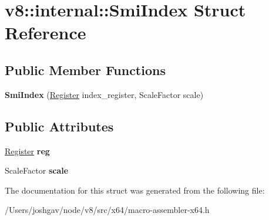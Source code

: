 \hypertarget{structv8_1_1internal_1_1_smi_index}{}\section{v8\+:\+:internal\+:\+:Smi\+Index Struct Reference}
\label{structv8_1_1internal_1_1_smi_index}
\subsection*{Public Member Functions}
\begin{DoxyCompactItemize}
\item 
{\bfseries Smi\+Index} (\hyperlink{structv8_1_1internal_1_1_register}{Register} index\+\_\+register, Scale\+Factor scale)\hypertarget{structv8_1_1internal_1_1_smi_index_a2ee8fe322cc99e028ea9684e3acc9470}{}\label{structv8_1_1internal_1_1_smi_index_a2ee8fe322cc99e028ea9684e3acc9470}

\end{DoxyCompactItemize}
\subsection*{Public Attributes}
\begin{DoxyCompactItemize}
\item 
\hyperlink{structv8_1_1internal_1_1_register}{Register} {\bfseries reg}\hypertarget{structv8_1_1internal_1_1_smi_index_aaf56c81c61f966fe43eb44d473206b52}{}\label{structv8_1_1internal_1_1_smi_index_aaf56c81c61f966fe43eb44d473206b52}

\item 
Scale\+Factor {\bfseries scale}\hypertarget{structv8_1_1internal_1_1_smi_index_ae40059bb0f0f42f6f98a0d6a2d827843}{}\label{structv8_1_1internal_1_1_smi_index_ae40059bb0f0f42f6f98a0d6a2d827843}

\end{DoxyCompactItemize}


The documentation for this struct was generated from the following file\+:\begin{DoxyCompactItemize}
\item 
/\+Users/joshgav/node/v8/src/x64/macro-\/assembler-\/x64.\+h\end{DoxyCompactItemize}
